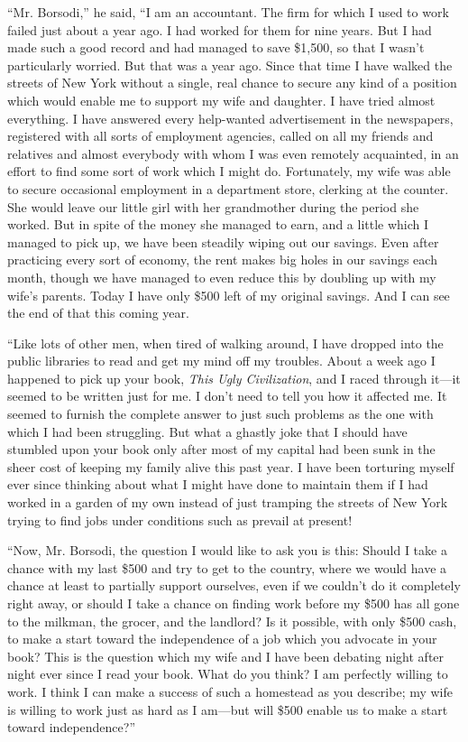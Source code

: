 \documentclass{book}
\begin{document}
“Mr. Borsodi,” he said, “I am an accountant. The firm for which I used to work failed just about a year ago. I had worked for them for nine years. But I had made such a good record and had managed to save \$1,500, so that I wasn’t particularly worried. But that was a year ago. Since that time I have walked the streets of New York without a single, real chance to secure any kind of a position which would enable me to support my wife and daughter. I have tried almost everything. I have answered every help-wanted advertisement in the newspapers, registered with all sorts of employment agencies, called on all my friends and relatives and almost everybody with whom I was even remotely acquainted, in an effort to find some sort of work which I might do. Fortunately, my wife was able to secure occasional employment in a department store, clerking at the counter. She would leave our little girl with her grandmother during the period she worked. But in spite of the money she managed to earn, and a little which I managed to pick up, we have been steadily wiping out our savings. Even after practicing every sort of economy, the rent makes big holes in our savings each month, though we have managed to even reduce this by doubling up with my wife’s parents. Today I have only \$500 left of my original savings. And I can see the end of that this coming year.

“Like lots of other men, when tired of walking around, I have dropped into the public libraries to read and get my mind off my troubles. About a week ago I happened to pick up your book, \emph{This Ugly Civilization}, and I raced through it—it seemed to be written just for me. I don’t need to tell you how it affected me. It seemed to furnish the complete answer to just such problems as the one with which I had been struggling. But what a ghastly joke that I should have stumbled upon your book only after most of my capital had been sunk in the sheer cost of keeping my family alive this past year. I have been torturing myself ever since thinking about what I might have done to maintain them if I had worked in a garden of my own instead of just tramping the streets of New York trying to find jobs under conditions such as prevail at present!

“Now, Mr. Borsodi, the question I would like to ask you is this: Should I take a chance with my last \$500 and try to get to the country, where we would have a chance at least to partially support ourselves, even if we couldn’t do it completely right away, or should I take a chance on finding work before my \$500 has all gone to the milkman, the grocer, and the landlord? Is it possible, with only \$500 cash, to make a start toward the independence of a job which you advocate in your book? This is the question which my wife and I have been debating night after night ever since I read your book. What do you think? I am perfectly willing to work. I think I can make a success of such a homestead as you describe; my wife is willing to work just as hard as I am—but will \$500 enable us to make a start toward independence?”
\end{document}
